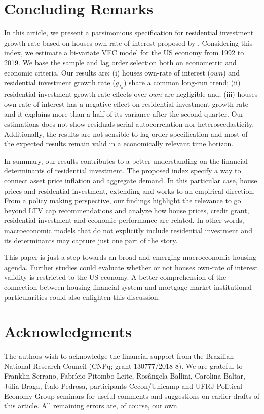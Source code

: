 \documentclass[12pt, a4paper]{article}
\begin{document}
\section{Concluding Remarks}
\label{sec:orgbabdcd9}
\label{sec:Conclusion}
In this article, we present a parsimonious specification for residential investment growth rate based on houses own-rate of interest proposed by \textcite{teixeira_crescimento_2015}.
Considering this index, we estimate a bi-variate VEC model for the US economy from 1992 to 2019.
We base the sample and lag order selection both on econometric and economic criteria.
Our results are:
	(i) houses own-rate of interest (\(own\)) and residential investment growth rate (\(g_{I_h}\)) share a common long-run trend;
	(ii) residential investment growth rate effects over \(own\) are negligible and;
	(iii) houses own-rate of interest has a negative effect on residential investment growth rate and it explains more than a half of its variance after the second quarter.
Our estimations does not show residuals serial autocorrelation nor heteroscedasticity.
Additionally, the results are not sensible to lag order specification and most of the expected results remain valid in a economically relevant time horizon.

In summary, our results contributes to a better understanding on the financial determinants of residential investment.
The proposed index specify  a way to connect asset price inflation  and aggregate demand.
In this particular case, house prices and residential investment, extending \textcite{petrini_2021_TD} and \textcite{teixeira_crescimento_2015} works to an empirical direction.
From a policy making perspective, our findings highlight the relevance to go beyond LTV cap recommendations and analyze how house prices, credit grant, residential investment and economic performance are related.
In other words, macroeconomic models that do not explicitly include residential investment and its determinants may capture just one part of the story.

This paper is just a step towards an broad and emerging macroeconomic housing agenda.
Further studies could evaluate whether or not houses own-rate of interest validity is restricted to the US economy.
A better comprehension of the connection between housing financial system and mortgage market institutional particularities could also enlighten this discussion.


\section*{Acknowledgments}
\label{sec:orgcc93d4f}
\noindent The authors wish to acknowledge the financial support from the Brazilian National Research Council (CNPq; grant 130777/2018-8). We are grateful to Franklin Serrano, Fabrício Pitombo Leite, Rosângela Ballini, Carolina Baltar, Júlia Braga, Ítalo Pedrosa, participants Cecon/Unicamp and UFRJ Political Economy Group seminars for useful comments and suggestions on earlier drafts of this article. All remaining errors are, of course, our own.
\end{document}
